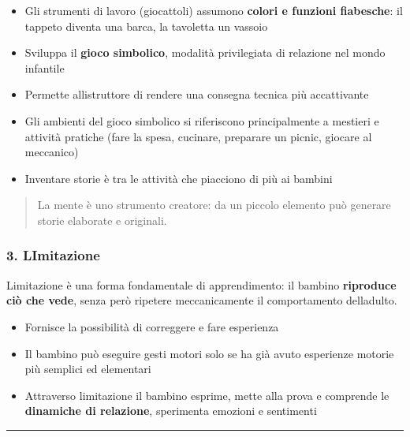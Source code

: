 \documentclass[a4paper,11pt]{article}
\providecommand{\tightlist}{%
  \setlength{\itemsep}{0pt}\setlength{\parskip}{0pt}}
\begin{document}
\begin{itemize}
      \tightlist
      \item
            Gli strumenti di lavoro (giocattoli) assumono \textbf{colori e
                  funzioni fiabesche}: il tappeto diventa una barca, la tavoletta un
            vassoio
      \item
            Sviluppa il \textbf{gioco simbolico}, modalità privilegiata di
            relazione nel mondo infantile
      \item
            Permette all\textquotesingle istruttore di rendere una consegna
            tecnica più accattivante
      \item
            Gli ambienti del gioco simbolico si riferiscono principalmente a
            mestieri e attività pratiche (fare la spesa, cucinare, preparare un
            picnic, giocare al meccanico)
      \item
            Inventare storie è tra le attività che piacciono di più ai bambini
\end{itemize}

\begin{quote}
      La mente è uno strumento creatore: da un piccolo elemento può generare
      storie elaborate e originali.
\end{quote}

\subsubsection{3. L\textquotesingle Imitazione}\label{limitazione}

L\textquotesingle imitazione è una forma fondamentale di apprendimento:
il bambino \textbf{riproduce ciò che vede}, senza però ripetere
meccanicamente il comportamento dell\textquotesingle adulto.

\begin{itemize}
      \tightlist
      \item
            Fornisce la possibilità di correggere e fare esperienza
      \item
            Il bambino può eseguire gesti motori solo se ha già avuto esperienze
            motorie più semplici ed elementari
      \item
            Attraverso l\textquotesingle imitazione il bambino esprime, mette alla
            prova e comprende le \textbf{dinamiche di relazione}, sperimenta
            emozioni e sentimenti
\end{itemize}

\begin{center}\rule{0.5\linewidth}{0.5pt}\end{center}
\end{document}
